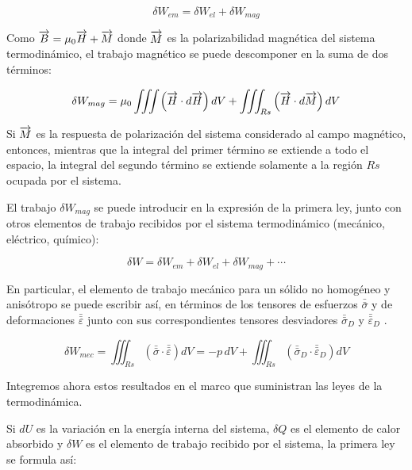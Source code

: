 \begin{equation}
	\label{eq:D9}
	\delta W_{em} = \delta W_{el} + \delta W_{mag}
\end{equation}

Como $\overrightarrow{B}= \mu_{0}\overrightarrow{H}+\overrightarrow{M}$ donde $\overrightarrow{M}$ es la polarizabilidad magnética del sistema termodinámico, el trabajo magnético se puede descomponer en la suma de dos términos:

\begin{equation}
	\label{eq:D10}
	\delta W_{mag} = \mu_{0} \iiint \left( \overrightarrow{H}\cdot d\overrightarrow{H} \right)dV+ \iiint_{Rs} \left( \overrightarrow{H}\cdot d\overrightarrow{M} \right)dV
\end{equation}

Si $\overrightarrow{M}$ es la respuesta de polarización del sistema considerado al campo magnético, entonces, mientras que la integral del primer término se extiende a todo el espacio, la integral del segundo término se extiende solamente a la región $Rs$ ocupada por el sistema.

El trabajo $\delta W_{mag}$ se puede introducir en la expresión de la primera ley, junto con otros elementos de trabajo recibidos por el sistema termodinámico (mecánico, eléctrico, químico):

\begin{equation*}
	 \delta W = \delta W_{em} + \delta W_{el} + \delta W_{mag} + \cdots
\end{equation*}

En particular, el elemento de trabajo mecánico para un sólido no homogéneo y anisótropo se puede escribir así, en términos de los tensores de esfuerzos $\bar{\bar{\sigma}}$ y de deformaciones $\bar{\bar{\varepsilon}}$ junto con sus correspondientes tensores desviadores $\bar{\bar{\sigma}}_{D}$ y $\bar{\bar{\varepsilon}}_{D}$ \citep{Laura1}.

\begin{equation}
	\label{eq:D11}
	 \delta W_{mec} = \iiint_{Rs}\left( \bar{\bar{\sigma}} \cdot \bar{\bar{\varepsilon}} \right)dV=-p\,dV+\iiint_{Rs}\left( \bar{\bar{\sigma}}_{D} \cdot \bar{\bar{\varepsilon}}_{D}  \right)dV  
\end{equation}

Integremos ahora estos resultados en el marco que suministran las leyes de la termodinámica.

Si $dU$ es la variación en la energía interna del sistema, $\delta Q$ es el elemento de calor absorbido y $\delta W$ es el elemento de trabajo recibido por el sistema, la primera ley se formula así: 


